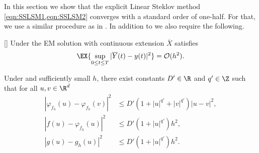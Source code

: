 	In this section we show that the explicit Linear Steklov method 
\cref{eqn:SSLSM1,eqn:SSLSM2} converges  with a standard order of one-half. For that,
we use a similar procedure  as in  \cite{Higham2002b}. In addition 
to  we also require the following.
 
 

 \begin{thm}\label{thm:EulerConvergenceRateHMS}[{\citet[Thm 4.4]{Higham2002b}}]
 	Under  the EM solution with continuous extension $\overline{X}$
 	satisfies
 	\begin{equation}
 	\EX{
 		\sup_{0\leq t \leq T}
 		|\overline{Y}(t)- y(t)|^2
 	} = \mathcal{O}(h^2).
 	\end{equation}
 \end{thm}
  
\begin{lem}
	Under  and sufficiently small $h$, there exist
	constants $D'\in \R$ and $q'\in \Z$ such that for all $u,v\in \R^d$
	\begin{align}
		|
			\varphi_{f_h}(u)
			-\varphi_{f_h}(v)
		|^2 
		&\leq
			D'
			\left(
				1 +|u|^{q'} +|v|^{q'}
			\right)
			|u-v|^2, \\
		|
			 f(u) -\varphi_{f_h}(u)
		|^2 
		&\leq
			D'
			\left(
				1 +|u|^{q'} 
				\right)
			h^2, \\
		|
			g(u) -g_h(u)
		|^2 				 
		&\leq
			D'
			\left(
				1 +|u|^{q'} 
			\right)
			h^2 . \label{eqn:ghPolyGrowth}
	\end{align}
\end{lem}

